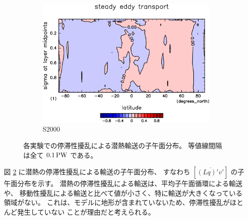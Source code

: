 \documentclass[body]{subfiles}
\begin{document}
\begin{figure}[t]
\begin{subfigure}{.4\textwidth}
		\includegraphics[width=\columnwidth]{S2000/MeriHeatTransTest@latentEn_SE,time=7300:7665-crop-rotate.pdf}
		\caption{S2000}\label{潜熱停滞性擾乱S2000}
	\end{subfigure}
	\caption[各実験でのに停滞性擾乱による潜熱輸送の子午面分布]{
		各実験での停滞性擾乱による潜熱輸送の子午面分布。
		等値線間隔は全て \(0.1\hmu{PW}\) である。
	}\label{潜熱停滞性擾乱}
\end{figure}

図 \ref{潜熱停滞性擾乱} に潜熱の停滞性擾乱による輸送の子午面分布、
すなわち \([\overline{(Lq)'v'}]\) の子午面分布を示す。
潜熱の停滞性擾乱による輸送は、平均子午面循環による輸送や、
移動性擾乱による輸送と比べて値が小さく、特に輸送が大きくなっている領域がない。
これは、モデルに地形が含まれていないため、停滞性擾乱がほとんど発生していない
ことが理由だと考えられる。
\end{document}
